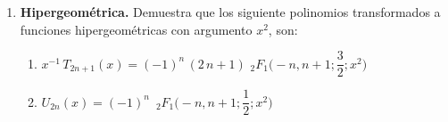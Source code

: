 \begin{enumerate}
\begin{enumerate}
\end{enumerate}
\item \textbf{Hipergeométrica. } Demuestra que los siguiente polinomios transformados a funciones hipergeométricas con argumento $x^{2}$, son:
\begin{enumerate}
\item $x^{-1} \, T_{2n+1} (x) = (-1)^{n} \, (2 \, n + 1 ) \, \, {}_{2}F_{1} \bigg(-n, n+1; \dfrac{3}{2}; x^{2} \bigg)$
\item $U_{2n} (x) = (-1)^{n} \, \, \, {}_{2}F_{1} \bigg(-n, n + 1; \dfrac{1}{2}; x^{2} \bigg)$
\end{enumerate}
\end{enumerate}

